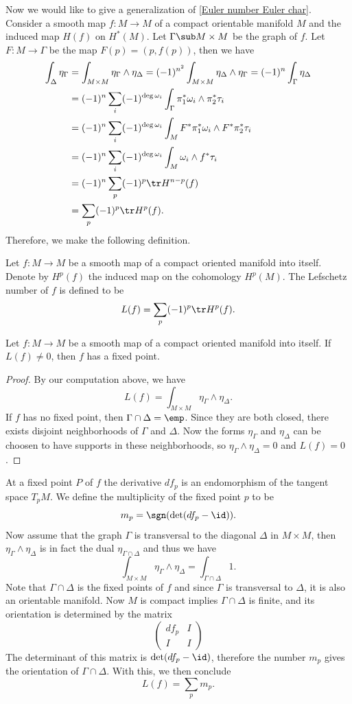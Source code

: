Now we would like to give a generalization of \cref{Euler number Euler char}. Consider a smooth map $f:M\to M$ of a compact orientable manifold $M$ and the 
induced map $H(f)$ on $H^*(M)$. Let $\Gamma\sub M\times M$ be the graph of $f$. Let $F:M\to\Gamma$ be the map $F(p)=(p,f(p))$, then we have
\begin{align*}
\int_\Delta\eta_\Gamma&=\int_{M\times M}\eta_\Gamma\wedge\eta_\Delta=(-1)^{n^2}\int_{M\times M}\eta_\Delta\wedge\eta_\Gamma=(-1)^n\int_\Gamma\eta_\Delta\\
&=(-1)^n\sum_i(-1)^{\deg\omega_i}\int_\Gamma\pi_1^*\omega_i\wedge\pi_2^*\tau_i\\
&=(-1)^n\sum_i(-1)^{\deg\omega_i}\int_M F^*\pi_1^*\omega_i\wedge F^*\pi_2^*\tau_i\\
&=(-1)^n\sum_i(-1)^{\deg\omega_i}\int_M\omega_i\wedge f^*\tau_i\\
&=(-1)^n\sum_p(-1)^{p}\tr H^{n-p}(f)\\
&=\sum_p(-1)^p\tr H^p(f).
\end{align*}
Therefore, we make the following definition.
\begin{definition}
Let $f:M\to M$ be a smooth map of a compact oriented manifold into itself. Denote by $H^p(f)$ the induced map on the cohomology $H^p(M)$. The Lefschetz number of $f$ is 
defined to be
\[L(f)=\sum_p(-1)^p\tr H^p(f).\]
\end{definition}
\begin{theorem}
Let $f:M\to M$ be a smooth map of a compact oriented manifold into itself. If $L(f)\neq 0$, then $f$ has a fixed point.
\end{theorem}
\begin{proof}
By our computation above, we have
\[L(f)=\int_{M\times M}\eta_\Gamma\wedge\eta_\Delta.\]
If $f$ has no fixed point, then $\Gamma\cap\Delta=\emp$. Since they are both closed, there exists disjoint neighborhoods of $\Gamma$ and $\Delta$. Now the forms 
$\eta_\Gamma$ and $\eta_\Delta$ can be choosen to have supports in these neighborhoods, so $\eta_\Gamma\wedge\eta_\Delta=0$ and $L(f)=0$. 
\end{proof}
At a fixed point $P$ of $f$ the derivative $df_p$ is an endomorphism of the tangent space $T_pM$. We define the multiplicity of the fixed point $p$ to be
\[m_p=\sgn(\det(df_p-\id)).\]
Now assume that the graph $\Gamma$ is transversal to the diagonal $\Delta$ in $M\times M$, then $\eta_\Gamma\wedge\eta_\Delta$ is in fact the dual $\eta_{\Gamma\cap\Delta}$ 
and thus we have
\[\int_{M\times M}\eta_\Gamma\wedge\eta_\Delta=\int_{\Gamma\cap\Delta}1.\]
Note that $\Gamma\cap\Delta$ is the fixed points of $f$ and since $\Gamma$ is transversal to $\Delta$, it is also an orientable manifold. Now $M$ is compact implies 
$\Gamma\cap\Delta$ is finite, and its orientation is determined by the matrix
\[\begin{pmatrix}
df_p&I\\
I&I
\end{pmatrix}\]
The determinant of this matrix is $\det(df_p-\id)$, therefore the number $m_p$ gives the orientation of $\Gamma\cap\Delta$. With this, we then conclude
\[L(f)=\sum_pm_p.\]
